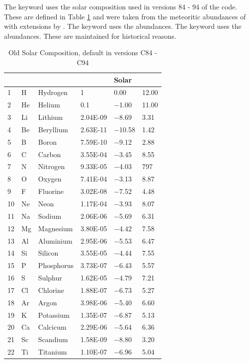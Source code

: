 The keyword  uses the solar composition
used in versions 84 - 94 of the code.
These are defined in Table \ref{tab:CompositionSolarOld}
and were taken from the
meteoritic abundances of \citet{Grevesse1989} with extensions by
\citet{Grevesse1993}.
The keyword  uses the \citet{Cameron1982}
abundances.
The keyword  uses the \citet{Allen1973} abundances.
These are maintained for historical reasons.

\begin{table}
\centering
\caption{Old Solar Composition, default in versions C84 - C94}
\label{tab:CompositionSolarOld}
\begin{tabular}{llllll}
\hline
&&&&Solar\\
\hline
1& H& Hydrogen& 1& 0.00& 12.00\\
2& He& Helium& 0.1& $-$1.00& 11.00\\
3& Li& Lithium& 2.04E-09& $-$8.69& 3.31\\
4& Be& Beryllium&  2.63E-11& $-$10.58&1.42\\
5& B& Boron&  7.59E-10& $-$9.12&2.88\\
\hline
6& C& Carbon&  3.55E-04&$-$3.45& 8.55\\
7& N& Nitrogen& 9.33E-05& $-$4.03& 797\\
8& O& Oxygen& 7.41E-04& $-$3.13& 8.87\\
9& F& Fluorine& 3.02E-08&  $-$7.52&4.48\\
10& Ne& Neon& 1.17E-04& $-$3.93& 8.07\\
\hline
11& Na& Sodium& 2.06E-06& $-$5.69& 6.31\\
12& Mg& Magnesium& 3.80E-05& $-$4.42& 7.58\\
13& Al& Aluminium& 2.95E-06& $-$5.53& 6.47\\
14& Si& Silicon& 3.55E-05& $-$4.44& 7.55\\
15& P& Phosphorus& 3.73E-07& $-$6.43& 5.57\\
\hline
16& S& Sulphur& 1.62E-05& $-$4.79& 7.21\\
17& Cl& Chlorine& 1.88E-07& $-$6.73& 5.27\\
18& Ar& Argon& 3.98E-06& $-$5.40& 6.60\\
19& K& Potassium& 1.35E-07& $-$6.87& 5.13\\
20& Ca& Calcicum&  2.29E-06&$-$5.64& 6.36\\
\hline
21& Sc& Scandium&  1.58E-09&  $-$8.80& 3.20\\
22& Ti& Titanium&  1.10E-07& $-$6.96& 5.04\\

\end{tabular}
\end{table}
